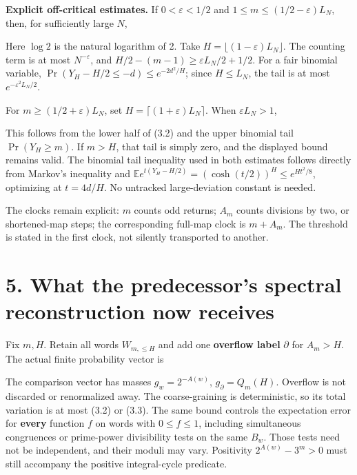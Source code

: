 \textbf{Explicit off-critical estimates.} If \(0<\varepsilon<1/2\) and
\(1\le m\le(1/2-\varepsilon)L_N\), then, for sufficiently large \(N\),


Here \(\log2\) is the natural logarithm of 2. Take
\(H=\lfloor(1-\varepsilon)L_N\rfloor\). The counting term is at most
\(N^{-\varepsilon}\), and \(H/2-(m-1)\ge\varepsilon L_N/2+1/2\). For a
fair binomial variable, \(\Pr(Y_H-H/2\le-d)\le e^{-2d^2/H}\); since
\(H\le L_N\), the tail is at most \(e^{-\varepsilon^2 L_N/2}\).

For \(m\ge(1/2+\varepsilon)L_N\), set
\(H=\lceil(1+\varepsilon)L_N\rceil\). When \(\varepsilon L_N>1\),


This follows from the lower half of (3.2) and the upper binomial tail
\(\Pr(Y_H\ge m)\). If \(m>H\), that tail is simply zero, and the
displayed bound remains valid. The binomial tail inequality used in both
estimates follows directly from Markov's inequality and
\(\mathbb E e^{t(Y_H-H/2)}=(\cosh(t/2))^H\le e^{Ht^2/8}\), optimizing at
\(t=4d/H\). No untracked large-deviation constant is needed.

The clocks remain explicit: \(m\) counts odd returns; \(A_m\) counts
divisions by two, or shortened-map steps; the corresponding full-map
clock is \(m+A_m\). The threshold is stated in the first clock, not
silently transported to another.

\section{5. What the predecessor's spectral reconstruction now receives}

Fix \(m,H\). Retain all words \(W_{m,\le H}\) and add one
\textbf{overflow label} \(\partial\) for \(A_m>H\). The actual finite
probability vector is


The comparison vector has masses \(g_w=2^{-A(w)}\),
\(g_\partial=Q_m(H)\). Overflow is not discarded or renormalized away.
The coarse-graining is deterministic, so its total variation is at most
(3.2) or (3.3). The same bound controls the expectation error for
\textbf{every} function \(f\) on words with \(0\le f\le1\), including
simultaneous congruences or prime-power divisibility tests on the same
\(B_w\). Those tests need not be independent, and their moduli may vary.
Positivity \(2^{A(w)}-3^m>0\) must still accompany the positive
integral-cycle predicate.

